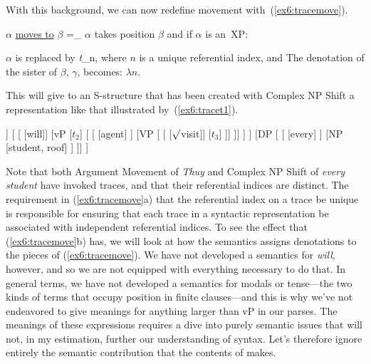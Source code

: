 With this background, we can now redefine movement with~(\ref{ex6:tracemove}).
\begin{exe}
\raggedright
	\ex \label{ex6:tracemove} $\alpha$ \underline{moves to} $\beta$ =_{} $\alpha$ takes position $\beta$ and if $\alpha$ is an~XP:
	\begin{xlist}
			\ex $\alpha$ is replaced by \emph{t}_n, where $n$ is a unique referential index, and
			\ex The denotation of the sister of $\beta$, $\gamma$, becomes: $\lambda n$\denotes{$\gamma$}.
	\end{xlist}
\end{exe}

This will give to an S-structure that has been created with Complex NP Shift a representation like that illustrated by~(\ref{ex6:tracet1}).
\begin{exe}
\raggedright
	\ex \label{ex6:tracet1}
	\footnotesize
	\begin{forest}
	[TP
		[TP 
			[DP [Thuy, roof]]
			[	
				[ [will]]
				[vP 
					[$t_2$]				
					[
						[ [agent] ]
						[VP 
						[ 
							[ [$\surd$visit]]
							[$t_3$]
						]]
				]]
			 ]
		]
		[DP [
			[ ]
			[NP [student, roof] ]
		]]
	]
	\end{forest}
\end{exe}
Note that both Argument Movement of \emph{Thuy} and Complex NP Shift of \emph{every student} have invoked traces, and that their referential indices are distinct. The requirement in (\ref{ex6:tracemove}a) that the referential index on a trace be unique is responsible for ensuring that each trace in a syntactic representation be associated with independent referential indices. To see the effect that (\ref{ex6:tracemove}b) has, we will look at how the semantics assigns denotations to the pieces of (\ref{ex6:tracemove}). We have not developed a semantics for \emph{will}, however, and so we are not equipped with everything necessary to do that. In general terms, we have not developed a semantics for modals or tense---the two kinds of terms that occupy  position in finite clauses---and this is why we've not endeavored to give meanings for anything larger than vP in our parses. The meanings of these expressions requires a dive into purely semantic issues that will not, in my estimation, further our understanding of syntax. Let's therefore ignore entirely the semantic contribution that the contents of  makes.

